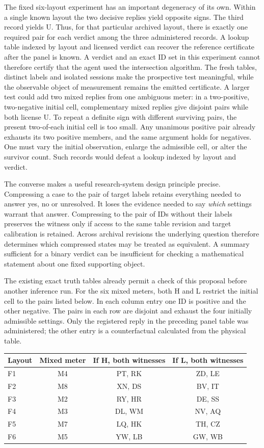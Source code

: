 \documentclass[12pt,letterpaper]{article}
\begin{document}
The fixed six-layout experiment has an important degeneracy of its own. Within a single known layout the two decisive replies yield opposite signs. The third record yields U. Thus, for that particular archived layout, there is exactly one required pair for each verdict among the three administered records. A lookup table indexed by layout and licensed verdict can recover the reference certificate after the panel is known. A verdict and an exact ID set in this experiment cannot therefore certify that the agent used the intersection algorithm. The fresh tables, distinct labels and isolated sessions make the prospective test meaningful, while the observable object of measurement remains the emitted certificate. A larger test could add two mixed replies from one ambiguous meter: in a two-positive, two-negative initial cell, complementary mixed replies give disjoint pairs while both license U. To repeat a definite sign with different surviving pairs, the present two-of-each initial cell is too small. Any unanimous positive pair already exhausts its two positive members, and the same argument holds for negatives. One must vary the initial observation, enlarge the admissible cell, or alter the survivor count. Such records would defeat a lookup indexed by layout and verdict.

The converse makes a useful research-system design principle precise. Compressing a case to the pair of target labels retains everything needed to answer yes, no or unresolved. It loses the evidence needed to say \emph{which} settings warrant that answer. Compressing to the pair of IDs without their labels preserves the witness only if access to the same table revision and target calibration is retained. Across archival revisions the underlying question therefore determines which compressed states may be treated as equivalent. A summary sufficient for a binary verdict can be insufficient for checking a mathematical statement about one fixed supporting object.

The existing exact truth tables already permit a check of this proposal before another inference run. For the six mixed meters, both H and L restrict the initial cell to the pairs listed below. In each column entry one ID is positive and the other negative. The pairs in each row are disjoint and exhaust the four initially admissible settings. Only the registered reply in the preceding panel table was administered; the other entry is a counterfactual calculated from the physical table.

\begin{center}
\begin{tabular}{@{}lccc@{}}\toprule
Layout & Mixed meter & If H, both witnesses & If L, both witnesses\\ \midrule
F1 & M4 & PT, RK & ZD, LE\\
F2 & M8 & XN, DS & BV, IT\\
F3 & M2 & RY, HR & DE, SS\\
F4 & M3 & DL, WM & NV, AQ\\
F5 & M7 & LQ, HK & TH, CZ\\
F6 & M5 & YW, LB & GW, WB\\ \bottomrule
\end{tabular}
\end{center}
\end{document}
